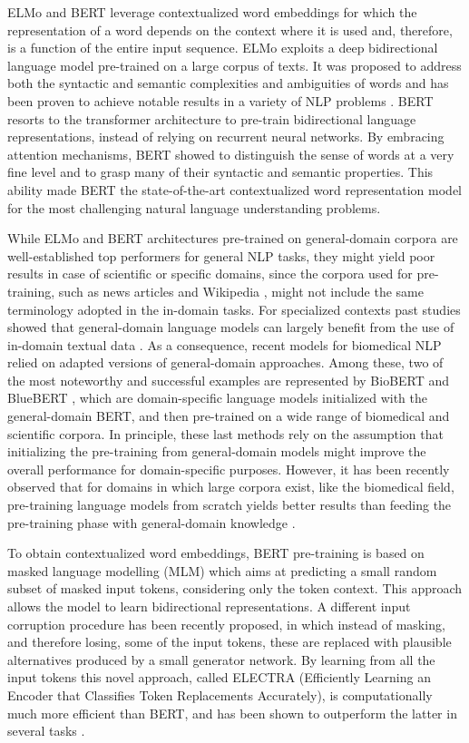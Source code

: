 \documentclass{article}
\begin{document}
ELMo and BERT leverage contextualized word embeddings for which the representation of a word depends on the context where it is used and, therefore, is a function of the entire input sequence. 
ELMo exploits a deep bidirectional language model pre-trained on a large corpus of texts. It was proposed to address both the syntactic and semantic complexities and ambiguities of words and has been proven to achieve notable  results in a variety of NLP problems \citep{Peters18}.
BERT \citep{Devlin19} resorts to the transformer architecture to pre-train bidirectional language representations, instead of relying on recurrent neural networks.
By embracing attention mechanisms, BERT showed to distinguish the sense of words at a very fine level and to grasp many of their syntactic and semantic properties.
This ability made BERT the state-of-the-art contextualized word representation model for the most challenging natural language understanding problems.

While ELMo and BERT architectures pre-trained on general-domain corpora are well-established top performers for general NLP tasks, they might yield poor results in case of scientific or specific domains, since the corpora used for pre-training, such as news articles and Wikipedia \citep{Belinkov19}, might not include the same terminology adopted in the in-domain tasks.
For specialized contexts past studies showed that general-domain language models can largely benefit from the use of in-domain textual data \citep{Peng19}.
As a consequence, recent models for biomedical NLP relied on adapted versions of general-domain approaches. 
Among these, two of the most noteworthy and successful examples are represented by BioBERT \citep{Lee2020} and BlueBERT \citep{Peng19}, which are domain-specific language models initialized with the general-domain BERT, and then pre-trained on a wide range of biomedical and scientific corpora. 
In principle, these last methods rely on the assumption that initializing the pre-training from general-domain models might improve the overall performance for domain-specific purposes.
However, it has been recently observed that for domains in which large corpora exist, like the biomedical field, pre-training language models from scratch yields better results than feeding the pre-training phase with general-domain knowledge \citep{Gu20}.

To obtain contextualized word embeddings, BERT pre-training is based on masked language modelling (MLM) which aims at predicting a small  random subset of masked input tokens, considering only the token context.
This approach allows the model to learn bidirectional representations.
A different input corruption procedure has been recently proposed, in which instead of masking, and therefore losing, some of the input tokens, these are replaced with plausible alternatives produced by a small generator network. 
By learning from all the input tokens this novel approach, called ELECTRA (Efficiently Learning an Encoder that Classifies Token Replacements Accurately), is computationally much more efficient than BERT, and has been shown to outperform the latter in several tasks \citep{Clark20}.
\end{document}
